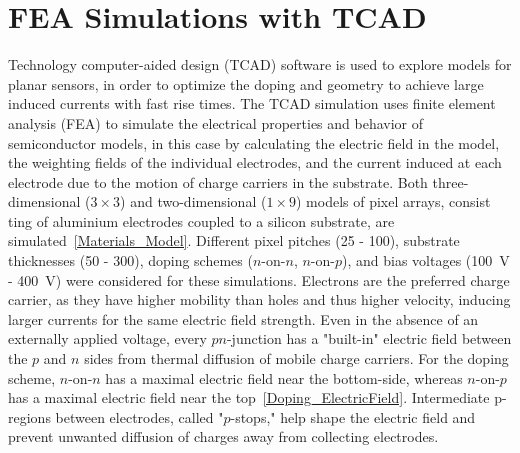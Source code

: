 \section{FEA Simulations with TCAD}
Technology computer-aided design (TCAD) software is used to explore models for planar sensors, in order to optimize the doping and geometry to achieve large induced currents with fast rise times.
The TCAD simulation uses finite element analysis (FEA) to simulate the electrical properties and behavior of semiconductor models, in this case by calculating the electric field in the model, the weighting fields of the individual electrodes, and the current induced at each electrode due to the motion of charge carriers in the substrate.
Both three-dimensional ($3 \times 3$) and two-dimensional ($1 \times 9$) models of pixel arrays, consist ting of aluminium electrodes coupled to a silicon substrate, are simulated~\ref{Materials_Model}.
Different pixel pitches (\SI{25}{\micron} - \SI{100}{\micron}), substrate thicknesses (\SI{50}{\micron} - \SI{300}{\micron}), doping schemes ($n$-on-$n$, $n$-on-$p$), and bias voltages (\SI{100}{\V} - \SI{400}{\V}) were considered for these simulations.
Electrons are the preferred charge carrier, as they have higher mobility than holes and thus higher velocity, inducing larger currents for the same electric field strength.
Even in the absence of an externally applied voltage, every $pn$-junction has a "built-in" electric field between the $p$ and $n$ sides from thermal diffusion of mobile charge carriers.
For the doping scheme, $n$-on-$n$ has a maximal electric field near the bottom-side, whereas $n$-on-$p$ has a maximal electric field near the top~\ref{Doping_ElectricField}.
Intermediate p-regions between electrodes, called "$p$-stops," help shape the electric field and prevent unwanted diffusion of charges away from collecting electrodes.

